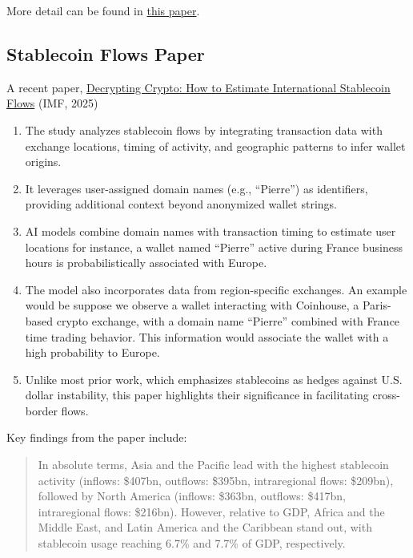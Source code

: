 \documentclass[
  11pt,
]{article}
\providecommand{\tightlist}{%
  \setlength{\itemsep}{0pt}\setlength{\parskip}{0pt}}\usepackage{longtable,booktabs,array}
\begin{document}
More detail can be found in
\href{https://www.ecb.europa.eu/pub/pdf/scpwps/ecb.wp2868~0c2ad2e6e7.en.pdf}{this
paper}.

\subsection{Stablecoin Flows Paper}\label{stablecoin-flows-paper}

A recent paper,
\href{https://www.imf.org/en/Publications/WP/Issues/2025/07/11/Decrypting-Crypto-How-to-Estimate-International-Stablecoin-Flows-568260}{Decrypting
Crypto: How to Estimate International Stablecoin Flows} (IMF, 2025)

\begin{enumerate}
\def\labelenumi{\arabic{enumi}.}
\tightlist
\item
  The study analyzes stablecoin flows by integrating transaction data
  with exchange locations, timing of activity, and geographic patterns
  to infer wallet origins.
\item
  It leverages user-assigned domain names (e.g., ``Pierre'') as
  identifiers, providing additional context beyond anonymized wallet
  strings.
\item
  AI models combine domain names with transaction timing to estimate
  user locations for instance, a wallet named ``Pierre'' active during
  France business hours is probabilistically associated with Europe.
\item
  The model also incorporates data from region-specific exchanges. An
  example would be suppose we observe a wallet interacting with
  Coinhouse, a Paris-based crypto exchange, with a domain name
  ``Pierre'' combined with France time trading behavior. This
  information would associate the wallet with a high probability to
  Europe.
\item
  Unlike most prior work, which emphasizes stablecoins as hedges against
  U.S. dollar instability, this paper highlights their significance in
  facilitating cross-border flows.
\end{enumerate}

Key findings from the paper include:

\begin{quote}
In absolute terms, Asia and the Pacific lead with the highest stablecoin
activity (inflows: \$407bn, outflows: \$395bn, intraregional flows:
\$209bn), followed by North America (inflows: \$363bn, outflows:
\$417bn, intraregional flows: \$216bn). However, relative to GDP, Africa
and the Middle East, and Latin America and the Caribbean stand out, with
stablecoin usage reaching 6.7\% and 7.7\% of GDP, respectively.
\end{quote}
\end{document}
